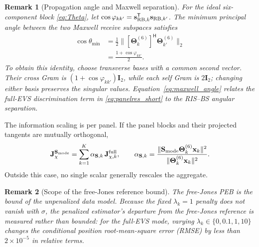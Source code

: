 \documentclass[letterpaper,journal]{IEEEtran}
\newtheorem{remark}{Remark}
\newcommand{\bx}{\mathbf{x}}
\newcommand{\bs}{\mathbf{s}}
\newcommand{\bI}{\mathbf{I}}
\newcommand{\bJ}{\mathbf{J}}
\newcommand{\bS}{\mathbf{S}}
\newcommand{\bTheta}{\boldsymbol{\Theta}}
\begin{document}
\begin{remark}[Propagation angle and Maxwell separation]
\label{rem:maxwell_angle}
For the ideal six-component block \eqref{eq:Theta}, let
$\cos\varphi_{kk'}=\bs_{{\rm RB},k}^{\mathsf T}\bs_{{\rm RB},k'}$.
The minimum principal angle between the two Maxwell receive subspaces satisfies
\begin{align}
 \cos\theta_{\min}
 &=\tfrac12\big\|[\bTheta_k^{(6)}]^{\mathsf H}
 \bTheta_{k'}^{(6)}\big\|_2\nonumber\\
 &=\frac{1+\cos\varphi_{kk'}}{2}.
 \label{eq:maxwell_angle}
\end{align}
To obtain this identity, choose transverse bases with a common second
vector. Their cross Gram is $(1+\cos\varphi_{kk'})\bI_2$, while each
self Gram is $2\bI_2$; changing either basis preserves the singular values.
Equation~\eqref{eq:maxwell_angle} relates the full-EVS discrimination term in
\eqref{eq:panelres_short} to the RIS--BS angular separation.
\end{remark}

The information scaling is per panel. If the panel blocks and their
projected tangents are mutually orthogonal,
\begin{equation}
	\bJ_\chi^{\bS_{\rm mode}}=\sum_{k=1}^{K}\alpha_{\bS,k}\,
	\bJ_{\chi,k}^{\rm full},
	\qquad
	\alpha_{\bS,k}=\frac{\|\bS_{\rm mode}\bTheta_k^{(6)}\bx_k\|^2}
		{\|\bTheta_k^{(6)}\bx_k\|^2}.
	\label{eq:c1_aggregate}
\end{equation}
Outside this case, no single scalar generally rescales the aggregate.

\begin{remark}[Scope of the free-Jones reference bound]
\label{rem:peb_reading}
The free-Jones PEB is the bound of the unpenalized data model. Because the
fixed $\lambda_k=1$ penalty does not vanish with $\sigma$, the penalized estimator's
departure from the free-Jones reference is measured rather than bounded: for
the full-EVS mode, varying $\lambda_k\in\{0,0.1,1,10\}$ changes the
conditional position root-mean-square error (RMSE) by less than
$2\times10^{-5}$ in relative terms.
\end{remark}
\end{document}
